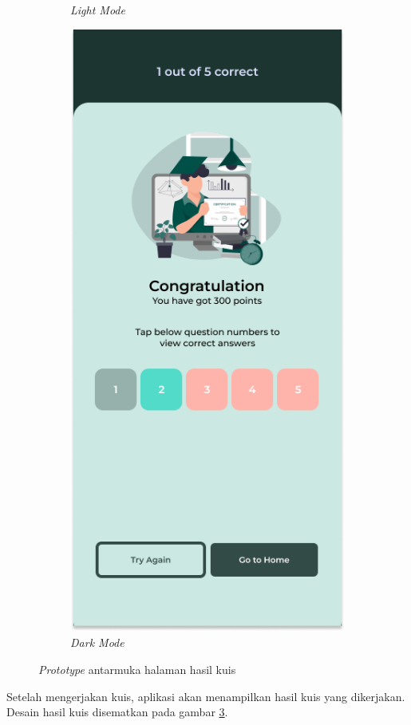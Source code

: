 \begin{figure}[H]
\begin{subfigure}[b]{0.23\textwidth}
	  \caption{\textit{Light Mode}}
	  \label{fig:HasilQuizResult}
	\end{subfigure}
	\begin{subfigure}[b]{0.23\textwidth}
		\centering
	  \includegraphics[width=\linewidth]{contents/chapter-3/images/HF-result-dt.png}
	  \caption{\textit{Dark Mode}}
	  \label{fig:HasilQuizResult2}
	\end{subfigure}
	\caption{\textit{Prototype} antarmuka halaman hasil kuis}
	\label{Fig:HasilFeatureSetQuizResult}
\end{figure}
Setelah mengerjakan kuis, aplikasi akan menampilkan hasil kuis yang dikerjakan. Desain hasil kuis disematkan pada gambar \ref*{Fig:HasilFeatureSetQuizResult}.

